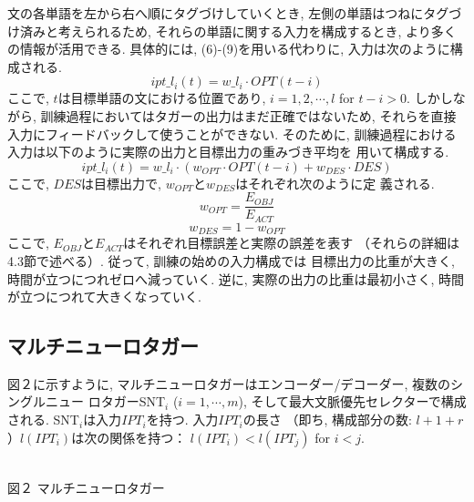 文の各単語を左から右へ順にタグづけしていくとき,
左側の単語はつねにタグづけ済みと考えられるため, 
それらの単語に関する入力を構成するとき, より多くの情報が活用できる.
具体的には, (6)-(9)を用いる代わりに, 入力は次のように構成される.
\begin{equation}
ipt\_l_{i}(t)=w\_l_{i} \cdot OPT(t-i)
\end{equation}
ここで, $t$は目標単語の文における位置であり, $i=1, 2, \cdots, l$
for $t-i>0$.
しかしながら, 訓練過程においてはタガーの出力はまだ正確ではないため, 
それらを直接入力にフィードバックして使うことができない. そのために, 
訓練過程における入力は以下のように実際の出力と目標出力の重みづき平均を
用いて構成する.
\begin{equation}
ipt\_l_{i}(t)=w\_l_{i} \cdot (w_{OPT} \cdot OPT(t-i)+w_{DES} \cdot DES)
\end{equation}
ここで, $DES$は目標出力で, $w_{OPT}$と$w_{DES}$はそれぞれ次のように定
義される.
\begin{equation}
w_{OPT}=\frac{E_{OBJ}}{E_{ACT}}
\end{equation}
\begin{equation}
w_{DES}=1-w_{OPT}
\end{equation}
ここで, $E_{OBJ}$と$E_{ACT}$はそれぞれ目標誤差と実際の誤差を表す 
（それらの詳細は4.3節で述べる）. 従って, 訓練の始めの入力構成では
目標出力の比重が大きく, 
時間が立つにつれゼロへ減っていく. 逆に, 実際の出力の比重は最初小さく, 時間
が立つにつれて大きくなっていく.

\subsection{マルチニューロタガー}
図２に示すように, マルチニューロタガーはエンコーダー/デコーダー, 複数のシングルニュー
ロタガーSNT$_{i}$ ($i=1, \cdots, m$), そして最大文脈優先セレクターで構成される. 
SNT$_{i}$は入力$IPT_{i}$を持つ. 入力$IPT_{i}$の長さ
（即ち, 構成部分の数: $l+1+r$）$l(IPT_{i})$は次の関係を持つ： 
$l(IPT_{i}) < l(IPT_{j})$ for $i < j$.
 
\begin{center}
 \\
図２ マルチニューロタガー
\end{center}

